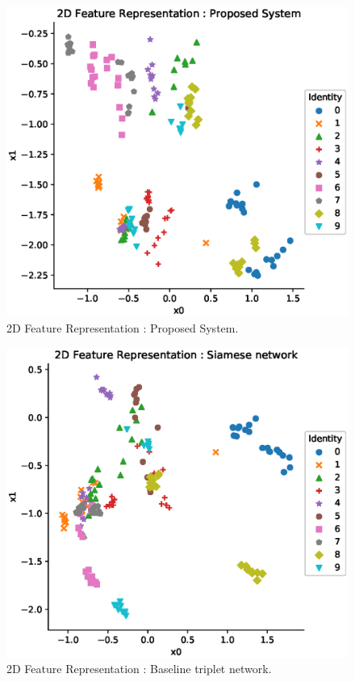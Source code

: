 \begin{figure}[!ht]
    \includegraphics[width=\textwidth]{fig_2d_triKAR_10_v1.eps}
    \caption{2D Feature Representation : Proposed System.} \label{fig_2d_triKAR_10}
\end{figure}
\begin{figure}[!ht]
    \includegraphics[width=\textwidth]{fig_2d_tribase_10_v1.eps}
    \caption{2D Feature Representation : Baseline triplet network.} \label{fig_2d_tribase_10}
\end{figure}
